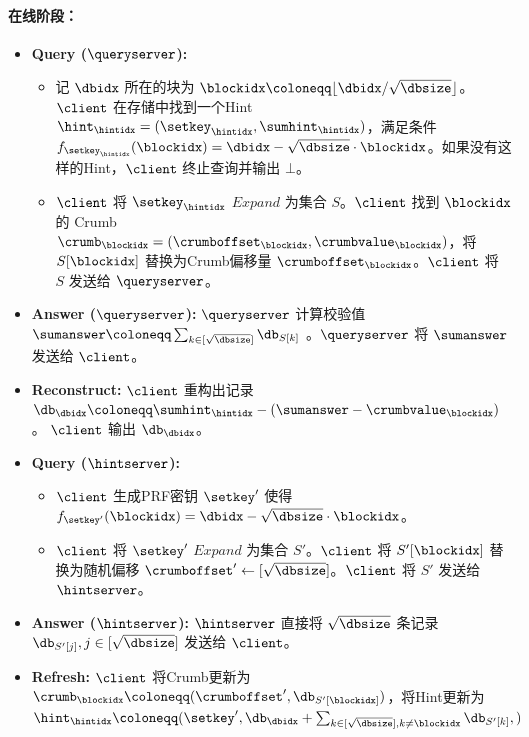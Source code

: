 \begin{mdframed}
        \paragraph{在线阶段：}
        \begin{itemize}
            \item \textbf{Query ($\queryserver$):}
                  \begin{itemize}
                      \item 记 $\dbidx$ 所在的块为 $\blockidx\coloneqq \lfloor \dbidx/\sqrt{\dbsize}\rfloor$。 $\client$ 在存储中找到一个Hint $\hint_\hintidx = (\setkey_\hintidx,\sumhint_\hintidx)$，满足条件 $f_{\setkey_\hintidx}(\blockidx) = \dbidx-\sqrt{\dbsize}\cdot \blockidx$。如果没有这样的Hint，$\client$ 终止查询并输出 $\bot$。
                      \item $\client$ 将 $\setkey_\hintidx$ $Expand$ 为集合 $S$。$\client$ 找到 $\blockidx$ 的 Crumb $\crumb_\blockidx=(\crumboffset_\blockidx, \crumbvalue_\blockidx)$，将 $S[\blockidx]$ 替换为Crumb偏移量 $\crumboffset_\blockidx$。$\client$ 将 $S$  发送给 $\queryserver$。
                  \end{itemize}
            \item \textbf{Answer ($\queryserver$):} $\queryserver$ 计算校验值 $\sumanswer\coloneqq \sum_{k\in [\sqrt{\dbsize}]}\db_{S[k]}$ 。$\queryserver$ 将 $\sumanswer$ 发送给 $\client$。
            \item \textbf{Reconstruct:} $\client$ 重构出记录 $\db_\dbidx \coloneqq  \sumhint_\hintidx-(\sumanswer-\crumbvalue_\blockidx)$。  $\client$ 输出 $\db_\dbidx$。
            \item \textbf{Query ($\hintserver$):}
                  \begin{itemize}
                      \item $\client$ 生成PRF密钥 $\setkey'$ 使得 $f_{\setkey'}(\blockidx) = \dbidx-\sqrt{\dbsize}\cdot \blockidx$。
                      \item $\client$ 将 $\setkey'$ $Expand$ 为集合 $S'$。$\client$ 将 $S'[\blockidx]$ 替换为随机偏移 $\crumboffset' \leftarrow [\sqrt{\dbsize}]$。$\client$ 将 $S'$ 发送给 $\hintserver$。
                  \end{itemize}
            \item \textbf{Answer ($\hintserver$):} $\hintserver$ 直接将 $\sqrt{\dbsize}$ 条记录 $\db_{S'[j]}, j\in [\sqrt{\dbsize}]$ 发送给 $\client$。
            \item \textbf{Refresh:} $\client$ 将Crumb更新为 $\crumb_\blockidx \coloneqq  (\crumboffset', \db_{S'[\blockidx]})$，将Hint更新为 $\hint_\hintidx \coloneqq  (\setkey',\db_\dbidx + \sum_{k\in [\sqrt{\dbsize}],k\neq \blockidx}\db_{S'[k]}, )$
        \end{itemize}
    \end{mdframed}
    \label{fig:two-server}
